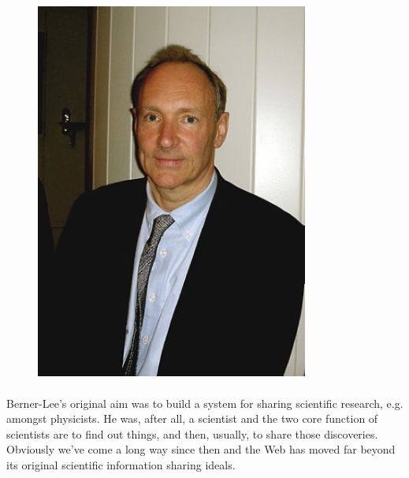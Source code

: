 \begin{figure}[H]
\centering
\includegraphics[width=0.8\textwidth]{figures/tim-berners-lee.png}
\label{fig:tim-berners-lee}
\end{figure}


\paragraph{} Berner-Lee's original aim was to build a system for sharing scientific research, e.g. amongst physicists. He was, after all, a scientist and the two core function of scientists are to find out things, and then, usually, to share those discoveries. Obviously we’ve come a long way since then and the Web has moved far beyond its original scientific information sharing ideals.

